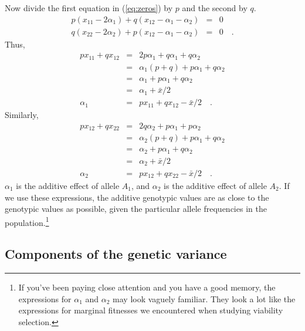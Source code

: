 \documentclass[12pt]{article}
\begin{document}
Now divide the first equation in (\ref{eq:zeros}) by $p$ and the
second by $q$.
\begin{eqnarray}
p(x_{11} - 2\alpha_1) + q(x_{12} - \alpha_1 - \alpha_2) &=& 0
\label{eq:zeros_divide_1} \\
q(x_{22} - 2\alpha_2) + p(x_{12} - \alpha_1 - \alpha_2) &=& 0 \quad
. \label{eq:zeros_divide_2}
\end{eqnarray}
Thus,
\begin{eqnarray*}
px_{11} + qx_{12} &=& 2p\alpha_1 + q\alpha_1 + q\alpha_2 \\
 &=& \alpha_1(p + q) + p\alpha_1 + q\alpha_2 \\
 &=& \alpha_1 + p\alpha_1 + q\alpha_2 \\
 &=& \alpha_1 + {\bar x}/2 \\
\alpha_1 &=& px_{11} + qx_{12} - {\bar x}/2 \quad .
\end{eqnarray*}
Similarly,
\begin{eqnarray*}
px_{12} + qx_{22} &=& 2q\alpha_2 + p\alpha_1 + p\alpha_2 \\
 &=& \alpha_2(p + q) + p\alpha_1 + q\alpha_2 \\
 &=& \alpha_2 + p\alpha_1 + q\alpha_2 \\
 &=& \alpha_2 + {\bar x}/2 \\
\alpha_2 &=& px_{12} + qx_{22} - {\bar x}/2 \quad .
\end{eqnarray*}
$\alpha_1$ is the additive effect of allele $A_1$, and $\alpha_2$ is
the additive effect of allele $A_2$. If we use these expressions, the
additive genotypic values are as close to the genotypic values as
possible, given the particular allele frequencies in the
population.\footnote{If you've been paying close attention and you
  have a good memory, the expressions for $\alpha_1$ and $\alpha_2$
  may look vaguely familiar. They look a lot like the expressions for
  marginal fitnesses we encountered when studying viability
  selection.}

\subsection*{Components of the genetic variance}
\end{document}
